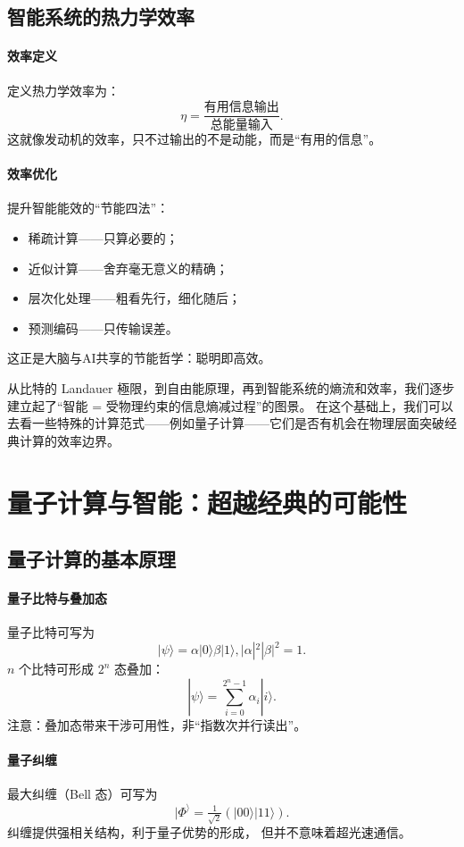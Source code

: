 \subsection{智能系统的热力学效率}

\paragraph{效率定义}
定义热力学效率为：
$$
\eta=\frac{\text{有用信息输出}}{\text{总能量输入}}.
$$
这就像发动机的效率，只不过输出的不是动能，而是“有用的信息”。

\paragraph{效率优化}
提升智能能效的“节能四法”：
\begin{itemize}
\item 稀疏计算——只算必要的；
\item 近似计算——舍弃毫无意义的精确；
\item 层次化处理——粗看先行，细化随后；
\item 预测编码——只传输误差。
\end{itemize}
这正是大脑与AI共享的节能哲学：聪明即高效。

从比特的 Landauer 極限，到自由能原理，再到智能系统的熵流和效率，我们逐步建立起了“智能 = 受物理约束的信息熵减过程”的图景。  
在这个基础上，我们可以去看一些特殊的计算范式——例如量子计算——它们是否有机会在物理层面突破经典计算的效率边界。

\section{量子计算与智能：超越经典的可能性}

\subsection{量子计算的基本原理}

\paragraph{量子比特与叠加态}
量子比特可写为
$$|\psi\rangle=\alpha|0\rangle\beta|1\rangle,|\alpha|^2|\beta|^2=1.$$
$n$ 个比特可形成 $2^n$ 态叠加：
$$|\psi\rangle=\sum_{i=0}^{2^n-1}\alpha_i|i\rangle.$$
注意：叠加态带来干涉可用性，非“指数次并行读出”。

\paragraph{量子纠缠}
最大纠缠（Bell 态）可写为
$$|\Phi^\rangle=\tfrac{1}{\sqrt{2}}(|00\rangle|11\rangle).$$
纠缠提供强相关结构，利于量子优势的形成，  
但并不意味着超光速通信。

